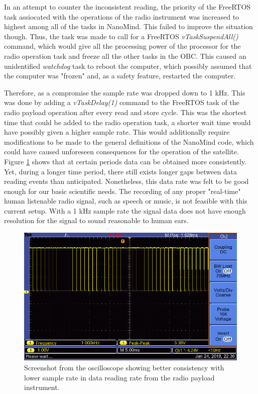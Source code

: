 \documentclass[english,12pt,a4paper,pdftex,elec,utf8]{aaltothesis}
\begin{document}
In an attempt to counter the inconsistent reading, the priority of the FreeRTOS task assiocated with the operations of the radio instrument was increased to highest among all of the tasks in NanoMind. This failed to improve the situation though. Thus, the task was made to call for a FreeRTOS \textit{vTaskSuspendAll()} command, which would give all the processing power of the processor for the radio operation task and freeze all the other tasks in the OBC. This caused an unidentified \textit{watchdog} task to reboot the computer, which possibly assumed that the computer was "frozen" and, as a safety feature, restarted the computer.\par
Therefore, as a compromise the sample rate was dropped down to 1 kHz. This was done by adding a \textit{vTaskDelay(1)} command to the FreeRTOS task of the radio payload operation after every read and store cycle. This was the shortest time that could be added to the radio operation task, a shorter wait time would have possibly given a higher sample rate. This would additionally require modifications to be made to the general definitions of the NanoMind code, which could have caused unforeseen consequences for the operation of the satellite. Figure \ref{payloadosc2} shows that at certain periods data can be obtained more consistently. Yet, during a longer time period, there still exists longer gaps between data reading events than anticipated. Nonetheless, this data rate was felt to be good enough for our basic scientific needs. The recording of any proper "real-time" human listenable radio signal, such as speech or music, is not feasible with this current setup. With a 1 kHz sample rate the signal data does not have enough resolution for the signal to sound reasonable to human ears. \par
\begin{figure}[h!]
\centering
\includegraphics[scale=0.5]{F0003TEK}
\caption{Screenshot from the oscilloscope showing better consistency with lower sample rate in data reading rate from the radio payload instrument.}
\label{payloadosc2}
\end{figure}
\end{document}
